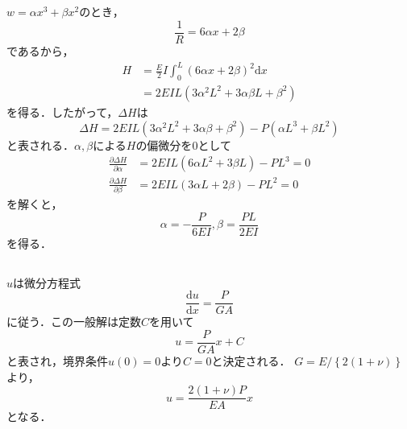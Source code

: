 \documentclass[a4paper]{jsarticle}
\begin{document}
\subsection{}
$w = \alpha x^3 + \beta x^2$のとき，
\begin{equation}
  \frac{1}{R} = 6 \alpha x + 2 \beta
\end{equation}
であるから，
\begin{equation}
  \begin{aligned}
    H & = \frac{E}{2} I \int_0^L (6 \alpha x + 2 \beta)^2 \mathrm{d} x \\
      & = 2 E I L (3 \alpha^2 L^2 + 3 \alpha \beta L + \beta^2)
  \end{aligned}
\end{equation}
を得る．したがって，$\Delta H$は
\begin{equation}
  \Delta H = 2 E I L \left(3 \alpha^2 L^2 + 3 \alpha \beta + \beta^2\right)
  - P \left(\alpha L^3 + \beta L^2\right)
\end{equation}
と表される．$\alpha, \beta$による$H$の偏微分を$0$として
\begin{align}
  \frac{\partial \Delta H}{\partial \alpha} & =
  2 E I L \left(6 \alpha L^2 + 3 \beta L\right) - P L^3 = 0 \\
  \frac{\partial \Delta H}{\partial \beta}  & =
  2 E I L \left(3 \alpha L + 2 \beta\right) - P L^2 = 0
\end{align}
を解くと，
\begin{equation}
  \alpha = -\frac{P}{6EI}, \beta = \frac{PL}{2EI}
\end{equation}
を得る．

\subsection{}
\subsubsection{}
$u$は微分方程式
\begin{equation}
  \frac{\mathrm{d} u}{\mathrm{d} x} = \frac{P}{GA}
\end{equation}
に従う．この一般解は定数$C$を用いて
\begin{equation}
  u = \frac{P}{G A} x + C
\end{equation}
と表され，境界条件$u(0) = 0$より$C = 0$と決定される．
$G = E / \left\{2 (1 + \nu)\right\}$より，
\begin{equation}
  u = \frac{2 (1 + \nu) P}{E A} x
\end{equation}
となる．
\end{document}
